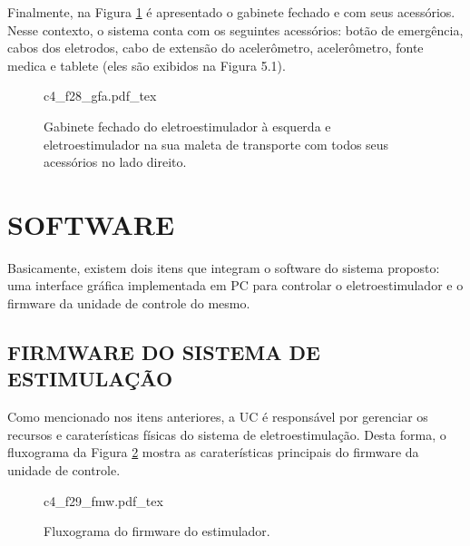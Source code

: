 Finalmente, na Figura \ref{fig:c4_f28_gfa} é apresentado o gabinete fechado e com seus acessórios. Nesse contexto, o sistema conta com os seguintes acessórios: botão de emergência, cabos dos eletrodos, cabo de extensão do acelerômetro, acelerômetro, fonte medica e tablete (eles são exibidos na Figura 5.1). %

\begin{figure}
    \centering %
    \small %
    \def\svgwidth{1\columnwidth}%
    {c4_f28_gfa.pdf_tex}
    \caption{Gabinete fechado do eletroestimulador à esquerda e eletroestimulador na sua maleta de transporte com todos seus acessórios no lado direito.}
    \label{fig:c4_f28_gfa}
\end{figure}


\section{SOFTWARE} 
Basicamente, existem dois itens que integram o software do sistema proposto: uma interface gráfica implementada em PC para controlar o eletroestimulador e o firmware da unidade de controle do mesmo.

\subsection{FIRMWARE DO SISTEMA DE ESTIMULAÇÃO} 
Como mencionado nos itens anteriores, a \acrshort{UC} é responsável por gerenciar os recursos e caraterísticas físicas do sistema de eletroestimulação. Desta forma, o fluxograma da Figura \ref{fig:c4_f29_fmw} mostra as caraterísticas principais do firmware da unidade de controle.

\begin{figure}
    \centering %
    \small %
    \def\svgwidth{1\columnwidth}%
    {c4_f29_fmw.pdf_tex}
    \caption{Fluxograma do firmware do estimulador.}
    \label{fig:c4_f29_fmw}
\end{figure}

